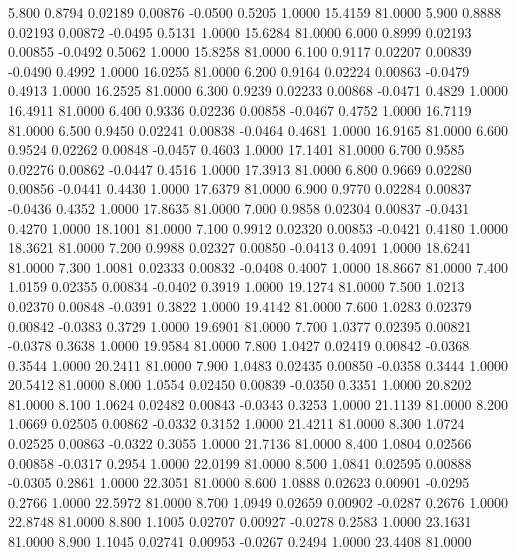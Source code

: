    5.800   0.8794   0.02189   0.00876  -0.0500   0.5205   1.0000  15.4159  81.0000
   5.900   0.8888   0.02193   0.00872  -0.0495   0.5131   1.0000  15.6284  81.0000
   6.000   0.8999   0.02193   0.00855  -0.0492   0.5062   1.0000  15.8258  81.0000
   6.100   0.9117   0.02207   0.00839  -0.0490   0.4992   1.0000  16.0255  81.0000
   6.200   0.9164   0.02224   0.00863  -0.0479   0.4913   1.0000  16.2525  81.0000
   6.300   0.9239   0.02233   0.00868  -0.0471   0.4829   1.0000  16.4911  81.0000
   6.400   0.9336   0.02236   0.00858  -0.0467   0.4752   1.0000  16.7119  81.0000
   6.500   0.9450   0.02241   0.00838  -0.0464   0.4681   1.0000  16.9165  81.0000
   6.600   0.9524   0.02262   0.00848  -0.0457   0.4603   1.0000  17.1401  81.0000
   6.700   0.9585   0.02276   0.00862  -0.0447   0.4516   1.0000  17.3913  81.0000
   6.800   0.9669   0.02280   0.00856  -0.0441   0.4430   1.0000  17.6379  81.0000
   6.900   0.9770   0.02284   0.00837  -0.0436   0.4352   1.0000  17.8635  81.0000
   7.000   0.9858   0.02304   0.00837  -0.0431   0.4270   1.0000  18.1001  81.0000
   7.100   0.9912   0.02320   0.00853  -0.0421   0.4180   1.0000  18.3621  81.0000
   7.200   0.9988   0.02327   0.00850  -0.0413   0.4091   1.0000  18.6241  81.0000
   7.300   1.0081   0.02333   0.00832  -0.0408   0.4007   1.0000  18.8667  81.0000
   7.400   1.0159   0.02355   0.00834  -0.0402   0.3919   1.0000  19.1274  81.0000
   7.500   1.0213   0.02370   0.00848  -0.0391   0.3822   1.0000  19.4142  81.0000
   7.600   1.0283   0.02379   0.00842  -0.0383   0.3729   1.0000  19.6901  81.0000
   7.700   1.0377   0.02395   0.00821  -0.0378   0.3638   1.0000  19.9584  81.0000
   7.800   1.0427   0.02419   0.00842  -0.0368   0.3544   1.0000  20.2411  81.0000
   7.900   1.0483   0.02435   0.00850  -0.0358   0.3444   1.0000  20.5412  81.0000
   8.000   1.0554   0.02450   0.00839  -0.0350   0.3351   1.0000  20.8202  81.0000
   8.100   1.0624   0.02482   0.00843  -0.0343   0.3253   1.0000  21.1139  81.0000
   8.200   1.0669   0.02505   0.00862  -0.0332   0.3152   1.0000  21.4211  81.0000
   8.300   1.0724   0.02525   0.00863  -0.0322   0.3055   1.0000  21.7136  81.0000
   8.400   1.0804   0.02566   0.00858  -0.0317   0.2954   1.0000  22.0199  81.0000
   8.500   1.0841   0.02595   0.00888  -0.0305   0.2861   1.0000  22.3051  81.0000
   8.600   1.0888   0.02623   0.00901  -0.0295   0.2766   1.0000  22.5972  81.0000
   8.700   1.0949   0.02659   0.00902  -0.0287   0.2676   1.0000  22.8748  81.0000
   8.800   1.1005   0.02707   0.00927  -0.0278   0.2583   1.0000  23.1631  81.0000
   8.900   1.1045   0.02741   0.00953  -0.0267   0.2494   1.0000  23.4408  81.0000
